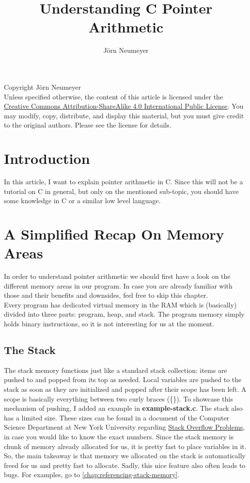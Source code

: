 \documentclass{article}
\author{J\"orn Neumeyer}
\title{Understanding C Pointer Arithmetic}
\begin{document}
  \maketitle
  Copyright \textcopyright {} J\"orn Neumeyer\\
  Unless specified otherwise, the content of this article is licensed under the \href{https://creativecommons.org/licenses/by-sa/4.0/legalcode}{Creative Commons Attribution-ShareAlike 4.0 International Public License}.
  You may modify, copy, distribute, and display this material, but you must give credit to the original authors. Please see the license for details.
  \tableofcontents
  \section{Introduction}
  In this article, I want to explain pointer arithmetic in C.
  Since this will not be a tutorial on C in general, but only on the mentioned sub-topic, you should have some knowledge in C or a similar low level language.
  \section{A Simplified Recap On Memory Areas}
  \label{chap:memory-areas}
  In order to understand pointer arithmetic we should first have a look on the different memory areas in our program.
  In case you are already familiar with those and their benefits and downsides, feel free to skip this chapter.\\
  Every program has dedicated virtual memory in the RAM which is (basically) divided into three parts: program, heap, and stack.
  The program memory simply holds binary instructions, so it is not interesting for us at the moment.
  \subsection{The Stack}
  \label{chap:stack}
  The stack memory functions just like a standard stack collection: items are pushed to and popped from its top as needed.
  Local variables are pushed to the stack as soon as they are initialized and popped after their scope has been left.
  A scope is basically everything between two curly braces (\{\}).
  To showcase this mechanism of pushing, I added an example in \textbf{example-stack.c}.
  The stack also has a limited size.
  These sizes can be found in a document of the Computer Science Department at New York University regarding \href{https://cs.nyu.edu/exact/core/doc/stackOverflow.txt}{Stack Overflow Problems}, in case you would like to know the exact numbers.
  Since the stack memory is chunk of memory already allocated for us, it is pretty fast to place variables in it.
  \\So, the main takeaway is that memory we allocated on the stack is automatically freed for us and pretty fast to allocate.
  Sadly, this nice feature also often leads to bugs.
  For examples, go to \autoref{chap:referencing-stack-memory}.
\end{document}
